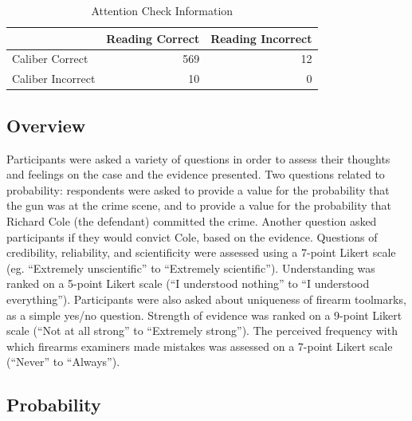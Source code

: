 \documentclass[print]{nuthesis}
\begin{document}
\begin{table}

\caption{\label{tab:attentioncheck}Attention Check Information}
\centering
\begin{tabular}[t]{l|r|r}
\hline
  & Reading Correct & Reading Incorrect\\
\hline
Caliber Correct & 569 & 12\\
\hline
Caliber Incorrect & 10 & 0\\
\hline
\end{tabular}
\end{table}

\hypertarget{overview}{%
\subsection{Overview}\label{overview}}

Participants were asked a variety of questions in order to assess their thoughts and feelings on the case and the evidence presented.
Two questions related to probability: respondents were asked to provide a value for the probability that the gun was at the crime scene, and to provide a value for the probability that Richard Cole (the defendant) committed the crime.
Another question asked participants if they would convict Cole, based on the evidence.
Questions of credibility, reliability, and scientificity were assessed using a 7-point Likert scale (eg. ``Extremely unscientific'' to ``Extremely scientific'').
Understanding was ranked on a 5-point Likert scale (``I understood nothing'' to ``I understood everything'').
Participants were also asked about uniqueness of firearm toolmarks, as a simple yes/no question.
Strength of evidence was ranked on a 9-point Likert scale (``Not at all strong'' to ``Extremely strong''). The perceived frequency with which firearms examiners made mistakes was assessed on a 7-point Likert scale (``Never'' to ``Always'').

\hypertarget{probability}{%
\subsection{Probability}\label{probability}}
\end{document}
